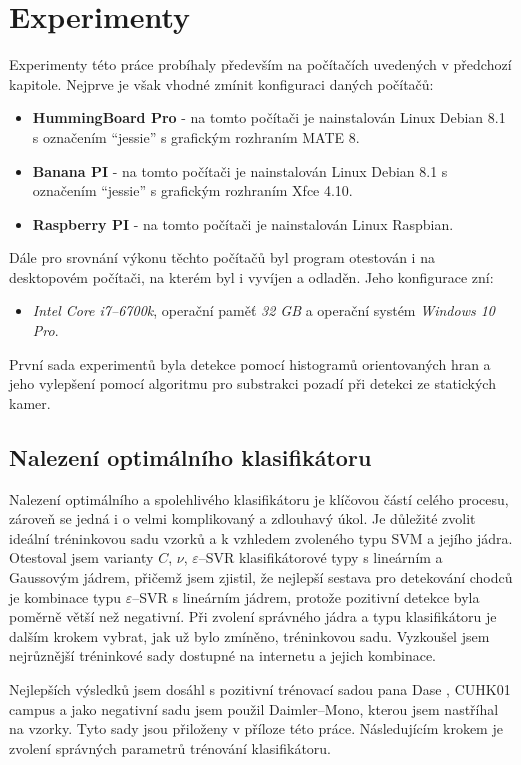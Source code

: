 \section{Experimenty}

Experimenty této práce probíhaly především na počítačích uvedených v předchozí kapitole. Nejprve je však vhodné zmínit konfiguraci daných počítačů:
\begin{itemize}
\item\textbf{HummingBoard Pro} - na tomto počítači je nainstalován Linux Debian 8.1 s označením ``jessie'' s grafickým rozhraním MATE 8.
\item\textbf{Banana PI} - na tomto počítači je nainstalován Linux Debian 8.1 s označením ``jessie'' s grafickým rozhraním Xfce 4.10. 
\item\textbf{Raspberry PI} - na tomto počítači je nainstalován Linux Raspbian. 
\end{itemize}
Dále pro srovnání výkonu těchto počítačů byl program otestován i na desktopovém počítači, na kterém byl i vyvíjen a odladěn. Jeho konfigurace zní: 
\begin{itemize}
\item\textit{Intel Core i7--6700k}, operační paměť  \textit{32 GB} a operační systém  \textit{Windows 10 Pro}.
\end{itemize}
První sada experimentů byla detekce pomocí histogramů orientovaných hran a jeho vylepšení pomocí algoritmu pro substrakci pozadí při detekci ze statických kamer.

\subsection{Nalezení optimálního klasifikátoru}

Nalezení optimálního a spolehlivého klasifikátoru je klíčovou částí celého procesu, zároveň se jedná i o velmi komplikovaný a zdlouhavý úkol. Je důležité zvolit ideální tréninkovou sadu vzorků a k vzhledem zvoleného typu SVM a jejího jádra. Otestoval jsem varianty $C$, $\nu$, $\varepsilon$--SVR klasifikátorové typy s lineárním a Gaussovým jádrem, přičemž jsem zjistil, že nejlepší sestava pro detekování chodců je kombinace typu $\varepsilon$--SVR s lineárním jádrem, protože pozitivní detekce byla poměrně větší než negativní. Při zvolení správného jádra a typu klasifikátoru je dalším krokem vybrat, jak už bylo zmíněno, tréninkovou sadu. Vyzkoušel jsem nejrůznější tréninkové sady dostupné na internetu a jejich kombinace.

Nejlepších výsledků jsem dosáhl s pozitivní trénovací sadou pana Dase \cite{sudipdas}, CUHK01 campus \cite{cuhk} a jako negativní sadu jsem použil Daimler--Mono\cite{daimler}, kterou jsem nastříhal na vzorky. Tyto sady jsou přiloženy v příloze této práce. Následujícím krokem je zvolení správných parametrů trénování klasifikátoru. 

